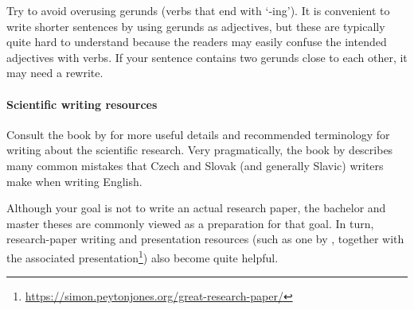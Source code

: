 Try to avoid overusing gerunds (verbs that end with `-ing'). It is convenient to write shorter sentences by using gerunds as adjectives, but these are typically quite hard to understand because the readers may easily confuse the intended adjectives with verbs. If your sentence contains two gerunds close to each other, it may need a rewrite.

\paragraph{Scientific writing resources}
Consult the book by \citet{glasman2010science} for more useful details and recommended terminology for writing about the scientific research. Very pragmatically, the book by \citet{sparling1989english} describes many common mistakes that Czech and Slovak (and generally Slavic) writers make when writing English.

Although your goal is not to write an actual research paper, the bachelor and master theses are commonly viewed as a preparation for that goal.
In turn, research-paper writing and presentation resources (such as one by \citet{jones2018write}, together with the associated presentation\footnote{\url{https://simon.peytonjones.org/great-research-paper/}}) also become quite helpful.
